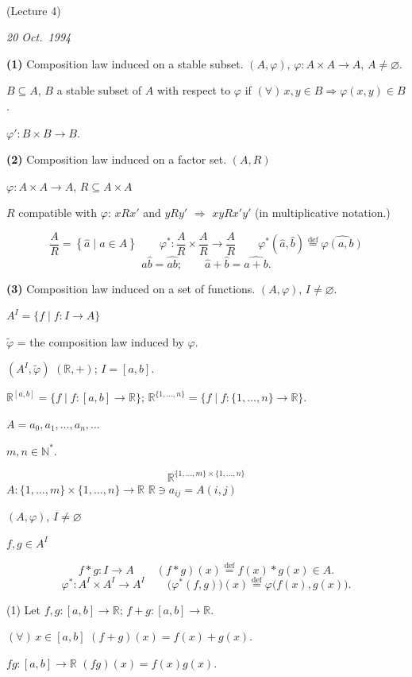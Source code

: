\documentclass[12pt]{article}
\begin{document}
\begin{center}
\\[2pt]
(Lecture 4)
\end{center}
\begin{flushright}
\textit{20 Oct.\ 1994}
\end{flushright}

\bigskip
\noindent\textbf{(1)} Composition law induced on a stable subset. $(A,\varphi)$, $\varphi : A\times A \to A$, $A\neq\varnothing$.

\noindent $B\subseteq A$, $B$ a stable subset of $A$ with respect to $\varphi$ if $(\forall)\,x,y\in B \Rightarrow \varphi(x,y)\in B$.

\noindent $\varphi' : B\times B \to B$.

\bigskip
\noindent\textbf{(2)} Composition law induced on a factor set. $(A,R)$

\noindent $\varphi : A\times A \to A$, \quad $R\subseteq A\times A$

\noindent $R$ compatible with $\varphi$: \quad $xRx'$ and $yRy'$ $\Rightarrow$ $xyRx'y'$ (in multiplicative notation.)

\[
\frac{A}{R} = \left\{\hat a \mid a\in A\right\} \qquad \varphi^* : \frac{A}{R}\times\frac{A}{R} \to \frac{A}{R} \qquad \varphi^*(\hat a,\hat b) \overset{\text{def}}{=} \widehat{\varphi(a,b)}
\]
\[
\hat a\hat b = \widehat{ab}; \qquad \hat a + \hat b = \widehat{a+b}.
\]

\bigskip
\noindent\textbf{(3)} Composition law induced on a set of functions. $(A,\varphi)$, $I\neq\varnothing$.

\noindent $A^I = \{f \mid f:I\to A\}$

\noindent $\tilde\varphi$ = the composition law induced by $\varphi$.

\noindent $(A^I,\tilde\varphi)$ \qquad $(\mathbb{R},+)$; $I=[a,b]$.

\noindent $\mathbb{R}^{[a,b]} = \{f \mid f:[a,b]\to\mathbb{R}\}$; \qquad $\mathbb{R}^{\{1,\ldots,n\}} = \{f \mid f:\{1,\ldots,n\}\to\mathbb{R}\}$.

\medskip
\noindent $A = a_0,a_1,\ldots,a_n,\ldots$

\noindent $m,n\in\mathbb{N}^*$.

\[
\mathbb{R}^{\{1,\ldots,m\}\times\{1,\ldots,n\}}
\]
\noindent $A : \{1,\ldots,m\}\times\{1,\ldots,n\} \to \mathbb{R}$ \hfill $\mathbb{R}\ni a_{ij} = A(i,j)$

\medskip
\noindent $(A,\varphi)$, $I\neq\varnothing$

\noindent $f,g\in A^I$

\[
f*g : I\to A \qquad (f*g)(x) \overset{\text{def}}{=} f(x)*g(x) \in A.
\]
\[
\varphi^* : A^I\times A^I \to A^I \qquad \big(\varphi^*(f,g)\big)(x) \overset{\text{def}}{=} \varphi\big(f(x),g(x)\big).
\]

\medskip
\noindent (1) Let $f,g : [a,b]\to\mathbb{R}$; \quad $f+g : [a,b]\to\mathbb{R}$.

\noindent $(\forall)\, x\in[a,b]$ \qquad $(f+g)(x) = f(x)+g(x)$.

\noindent $fg : [a,b]\to\mathbb{R}$ \qquad $(fg)(x) = f(x)g(x)$.
\end{document}
